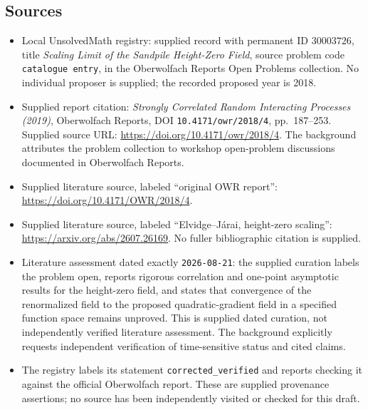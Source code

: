 \documentclass[11pt]{article}
\begin{document}
\subsection{Sources}
\begin{itemize}
\item Local UnsolvedMath registry: supplied record with permanent ID \(30003726\), title \emph{Scaling Limit of the Sandpile Height-Zero Field}, source problem code \texttt{catalogue entry}, in the Oberwolfach Reports Open Problems collection. No individual proposer is supplied; the recorded proposed year is 2018.
\item Supplied report citation: \emph{Strongly Correlated Random Interacting Processes (2019)}, Oberwolfach Reports, DOI \texttt{10.4171/owr/2018/4}, pp.\ 187--253. Supplied source URL: \url{https://doi.org/10.4171/owr/2018/4}. The background attributes the problem collection to workshop open-problem discussions documented in Oberwolfach Reports.
\item Supplied literature source, labeled ``original OWR report'': \url{https://doi.org/10.4171/OWR/2018/4}.
\item Supplied literature source, labeled ``Elvidge--Járai, height-zero scaling'': \url{https://arxiv.org/abs/2607.26169}. No fuller bibliographic citation is supplied.
\item Literature assessment dated exactly \texttt{2026-08-21}: the supplied curation labels the problem open, reports rigorous correlation and one-point asymptotic results for the height-zero field, and states that convergence of the renormalized field to the proposed quadratic-gradient field in a specified function space remains unproved. This is supplied dated curation, not independently verified literature assessment. The background explicitly requests independent verification of time-sensitive status and cited claims.
\item The registry labels its statement \texttt{corrected\_verified} and reports checking it against the official Oberwolfach report. These are supplied provenance assertions; no source has been independently visited or checked for this draft.
\end{itemize}
\end{document}
